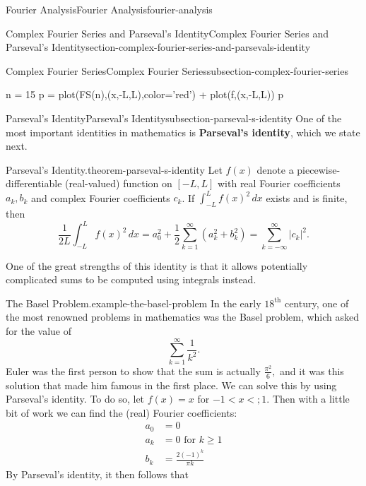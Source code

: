 \documentclass[oneside,10pt,]{book}
\newcommand{\terminology}[1]{\textbf{#1}}
\numberwithin{equation}{section}
\newcommand{\lt}{<}
\newcommand{\amp}{&}
\begin{document}
\begin{chapterptx}{Fourier Analysis}{}{Fourier Analysis}{}{}{fourier-analysis}
\begin{sectionptx}{Complex Fourier Series and Parseval's Identity}{}{Complex Fourier Series and Parseval's Identity}{}{}{section-complex-fourier-series-and-parsevals-identity}
\begin{subsectionptx}{Complex Fourier Series}{}{Complex Fourier Series}{}{}{subsection-complex-fourier-series}
\begin{sageinput}
n = 15
p = plot(FS(n),(x,-L,L),color='red') + plot(f,(x,-L,L))
p
\end{sageinput}
\end{subsectionptx}
%
%
\typeout{************************************************}
\typeout{************************************************}
%
\begin{subsectionptx}{Parseval's Identity}{}{Parseval's Identity}{}{}{subsection-parseval-s-identity}
\hypertarget{p-609}{}%
One of the most important identities in mathematics is \terminology{Parseval's identity}, which we state next.%
\begin{theorem}{Parseval's Identity.}{}{theorem-parseval-s-identity}%
\hypertarget{p-610}{}%
Let \(f(x)\) denote a piecewise-differentiable (real-valued) function on \([-L,L]\) with real Fourier coefficients \(a_{k},b_{k}\) and complex Fourier coefficients \(c_{k}\). If \(\int_{-L}^{L}f(x)^{2}\,dx\) exists and is finite, then%
\begin{equation*}
\frac{1}{2L}\int_{-L}^{L}f(x)^{2}\,dx = a^{2}_{0} + \frac{1}{2}\sum_{k=1}^{\infty}(a^{2}_{k}+b^{2}_{k}) = \sum_{k=-\infty}^{\infty}|c_{k}|^{2}.
\end{equation*}
%
\end{theorem}
\hypertarget{p-611}{}%
One of the great strengths of this identity is that it allows potentially complicated sums to be computed using integrals instead.%
\begin{example}{The Basel Problem.}{example-the-basel-problem}%
\hypertarget{p-612}{}%
In the early \(18^{\text{th}}\) century, one of the most renowned problems in mathematics was the Basel problem, which asked for the value of%
\begin{equation*}
\sum_{k=1}^{\infty}\frac{1}{k^{2}}.
\end{equation*}
Euler was the first person to show that the sum is actually \(\frac{\pi^{2}}{6},\) and it was this solution that made him famous\footnotemark{} in the first place. We can solve this by using Parseval's identity. To do so, let \(f(x) = x\) for \(-1 \lt x \lt; 1\). Then with a little bit of work we can find the (real) Fourier coefficients:%
\begin{align*}
a_{0} \amp = 0 \\
a_{k} \amp = 0 \text{ for } k\geq 1 \\
b_{k} \amp = \frac{2(-1)^{k}}{\pi k} 
\end{align*}
By Parseval's identity, it then follows that%

\end{example}
\end{subsectionptx}
\end{sectionptx}
\end{chapterptx}
\end{document}
